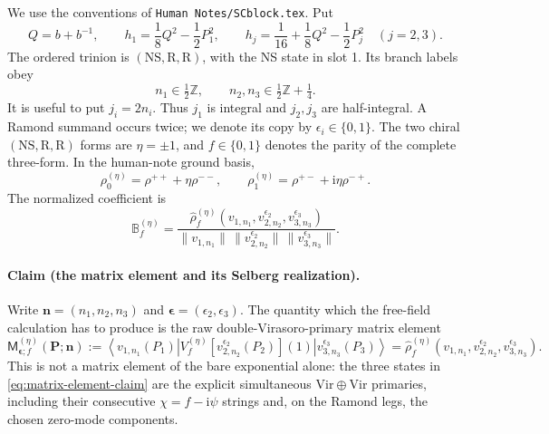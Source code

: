 \documentclass[11pt]{article}
\newcommand{\NS}{\mathrm{NS}}
\newcommand{\R}{\mathrm{R}}
\newcommand{\Vir}{\mathrm{Vir}}
\newcommand{\eps}{\epsilon}
\newcommand{\ii}{\mathrm i}
\begin{document}
We use the conventions of \texttt{Human Notes/SCblock.tex}.  Put
\begin{equation}
 Q=b+b^{-1},\qquad
 h_1=\frac18Q^2-\frac12P_1^2,\qquad
 h_j=\frac1{16}+\frac18Q^2-\frac12P_j^2\quad(j=2,3).
 \label{eq:weights}
\end{equation}
The ordered trinion is $(\NS,\R,\R)$, with the NS state in slot 1.  Its
branch labels obey
\begin{equation}
 n_1\in\tfrac12\mathbb Z,\qquad
 n_2,n_3\in\tfrac12\mathbb Z+\tfrac14.
 \label{eq:labels}
\end{equation}
It is useful to put $j_i=2n_i$.  Thus $j_1$ is integral and $j_2,j_3$ are
half-integral.  A Ramond summand occurs twice; we denote its copy by
$\eps_i\in\{0,1\}$.  The two chiral $(\NS,\R,\R)$ forms are
$\eta=\pm1$, and $f\in\{0,1\}$ denotes the parity of the complete
three-form.  In the human-note ground basis,
\begin{equation}
 \rho_0^{(\eta)}=\rho^{++}+\eta\rho^{--},\qquad
 \rho_1^{(\eta)}=\rho^{+-}+\ii\eta\rho^{-+}.
 \label{eq:human-forms}
\end{equation}
The normalized coefficient is
\begin{equation}
 \mathbb B_f^{(\eta)}
 =\frac{\widehat\rho_f^{(\eta)}
 (v_{1,n_1},v^{\eps_2}_{2,n_2},v^{\eps_3}_{3,n_3})}
 {\|v_{1,n_1}\|\,\|v^{\eps_2}_{2,n_2}\|\,
  \|v^{\eps_3}_{3,n_3}\|}.
 \label{eq:Bdef}
\end{equation}

\paragraph{Claim (the matrix element and its Selberg realization).}
Write $\boldsymbol n=(n_1,n_2,n_3)$ and
$\boldsymbol\eps=(\eps_2,\eps_3)$.  The quantity which the free-field
calculation has to produce is the raw double-Virasoro-primary matrix
element
\begin{equation}
 \mathsf M_{\boldsymbol\eps;f}^{(\eta)}(\boldsymbol P;\boldsymbol n)
 :=\left\langle v_{1,n_1}(P_1)\right|
 V_f^{(\eta)}\!\left[v_{2,n_2}^{\eps_2}(P_2)\right](1)
 \left|v_{3,n_3}^{\eps_3}(P_3)\right\rangle
 =\widehat\rho_f^{(\eta)}
 (v_{1,n_1},v_{2,n_2}^{\eps_2},v_{3,n_3}^{\eps_3}).
 \label{eq:matrix-element-claim}
\end{equation}
This is not a matrix element of the bare exponential alone: the three
states in \eqref{eq:matrix-element-claim} are the explicit simultaneous
$\Vir\oplus\Vir$ primaries, including their consecutive $\chi=f-\ii\psi$
strings and, on the Ramond legs, the chosen zero-mode components.
\end{document}
